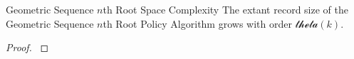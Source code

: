 \begin{theorem}{Geometric Sequence $n$th Root Space Complexity}
\label{thm:geom-seq-nth-root-algo-space-complexity}
The \gls{extant record size} of the Geometric Sequence $n$th Root Policy Algorithm grows with order $\mathcal{theta}{(k)}.$

\end{theorem}

\begin{proof}
\label{prf:geom-seq-nth-root-algo-space-complexity}



\end{proof}
